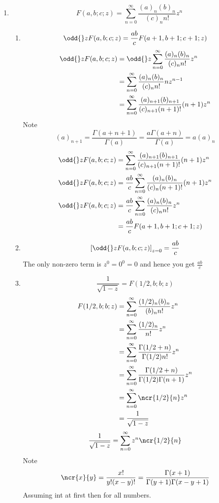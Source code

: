 \documentclass{E:/Documents/Latex/myassignment}
\begin{document}
\begin{enumerate}
	\item 
	\[F(a,b;c;z) = \sum_{n=0}^\infty \frac{(a)_n(b)_n}{(c)_n n!} z^n\]
	\begin{enumerate}
		\item 
		\[\odd{}z F(a,b;c;z) = \frac{ab}{c} F(a+1,b+1;c+1;z)\]
		\begin{align*}
			\odd{}z F(a,b;c;z) &= \odd{}z\sum_{n=0}^\infty \frac{(a)_n(b)_n}{(c)_n n!} z^n\\
			&=\sum_{n=0}^\infty \frac{(a)_n(b)_n}{(c)_n n!} nz^{n-1}\\
			&= \sum_{n=0}^\infty \frac{(a)_{n+1}(b)_{n+1}}{(c)_{n+1} (n+1)!} (n+1)z^{n}\\
		\end{align*}
		Note 
		\[(a)_{n+1} = \frac{\Gamma(a+n+1)}{\Gamma(a)} = \frac{a\Gamma(a+n)}{\Gamma(a)} = a(a)_{n}\]
		\begin{align*}
			\odd{}z F(a,b;c;z) &= \sum_{n=0}^\infty \frac{(a)_{n+1}(b)_{n+1}}{(c)_{n+1} (n+1)!} (n+1)z^{n}\\
			\odd{}z F(a,b;c;z) &= \frac{ab}{c}\sum_{n=0}^\infty \frac{(a)_{n}(b)_{n}}{(c)_{n} (n+1)!} (n+1)z^{n}\\
			\odd{}z F(a,b;c;z) &= \frac{ab}{c}\sum_{n=0}^\infty \frac{(a)_{n}(b)_{n}}{(c)_{n} n!} z^{n}\\
			&= \frac{ab}{c} F(a+1,b+1;c+1;z)
		\end{align*}
		\item 
		\[\left[\odd{}z F(a,b;c;z)\right]_{z=0} = \frac{ab}{c}\]
		The only non-zero term is $z^0 = 0^0 = 0$ and hence you get $\frac{ab}{c}$ 
		\item 
		\[\frac{1}{\sqrt{1-z}} = F(1/2,b;b;z)\]
		\begin{align*}
			F(1/2,b;b;z) &= \sum_{n=0}^\infty \frac{(1/2)_n(b)_n}{(b)_n n!} z^n\\
			&= \sum_{n=0}^\infty \frac{(1/2)_n}{n!} z^n\\
			&= \sum_{n=0}^\infty \frac{\Gamma(1/2 +n)}{\Gamma(1/2) n!} z^n\\
			&= \sum_{n=0}^\infty \frac{\Gamma(1/2 +n)}{\Gamma(1/2) \Gamma(n+1)} z^n\\
			&= \sum_{n=0}^\infty \ncr{1/2}{n} z^n\\
			&= \frac{1}{\sqrt{1-z}}
		\end{align*}
		\[\frac{1}{\sqrt{1-z}} = \sum_{n=0}^\infty z^n \ncr{1/2}{n}\]
		Note
		\[\ncr{x}{y} =\frac{x!}{y!(x-y)!} = \frac{\Gamma(x+1)}{\Gamma(y+1) \Gamma(x-y+1)}\]
		Assuming int at first then for all numbers.
	\end{enumerate}
\end{enumerate}
\end{document}
